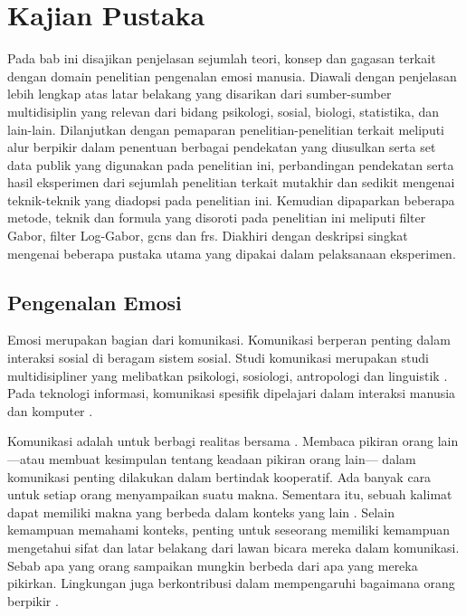 \chapter{Kajian Pustaka}
Pada bab ini disajikan penjelasan sejumlah teori, konsep dan gagasan terkait dengan domain penelitian pengenalan emosi manusia. Diawali dengan penjelasan lebih lengkap atas latar belakang yang disarikan dari sumber-sumber multidisiplin yang relevan dari bidang psikologi, sosial, biologi, statistika, dan lain-lain. Dilanjutkan dengan pemaparan penelitian-penelitian terkait meliputi alur berpikir dalam penentuan berbagai pendekatan yang diusulkan serta set data publik yang digunakan pada penelitian ini, perbandingan pendekatan serta hasil eksperimen dari sejumlah penelitian terkait mutakhir dan sedikit mengenai teknik-teknik yang diadopsi pada penelitian ini. Kemudian dipaparkan beberapa metode, teknik dan formula yang disoroti pada penelitian ini meliputi filter Gabor, filter Log-Gabor, \acrshort{gcns} dan \acrshort{frs}. Diakhiri dengan deskripsi singkat mengenai beberapa pustaka utama yang dipakai dalam pelaksanaan eksperimen.

\section{Pengenalan Emosi}
Emosi merupakan bagian dari komunikasi. Komunikasi berperan penting dalam interaksi sosial di beragam sistem sosial. Studi komunikasi merupakan studi multidisipliner yang melibatkan psikologi, sosiologi, antropologi dan linguistik . Pada teknologi informasi, komunikasi spesifik dipelajari dalam interaksi manusia dan komputer .

Komunikasi adalah untuk berbagi realitas bersama . Membaca pikiran orang lain ---atau membuat kesimpulan tentang keadaan pikiran orang lain--- dalam komunikasi penting dilakukan dalam bertindak kooperatif. Ada banyak cara untuk setiap orang menyampaikan suatu makna. Sementara itu, sebuah kalimat dapat memiliki makna yang berbeda dalam konteks yang lain . Selain kemampuan memahami konteks, penting untuk seseorang memiliki kemampuan mengetahui sifat dan latar belakang dari lawan bicara mereka dalam komunikasi. Sebab apa yang orang sampaikan mungkin berbeda dari apa yang mereka pikirkan. Lingkungan juga berkontribusi dalam mempengaruhi bagaimana orang berpikir .

